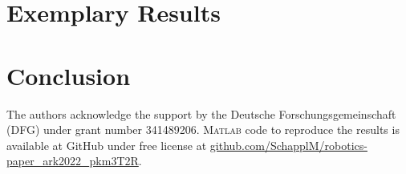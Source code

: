 \documentclass[graybox]{svmult}
\begin{document}
\begin{compactitem}
\item 
\end{compactitem}

\section{Exemplary Results}

\begin{compactitem}
\item 
\end{compactitem}

\section{Conclusion}


\begin{acknowledgement}
The authors acknowledge the support by the Deutsche Forschungsgemeinschaft (DFG) under grant number 341489206. \textsc{Matlab} code to reproduce the results
is available at GitHub under free license at \url{github.com/SchapplM/robotics-paper_ark2022_pkm3T2R}.

\end{acknowledgement}



\end{document}
